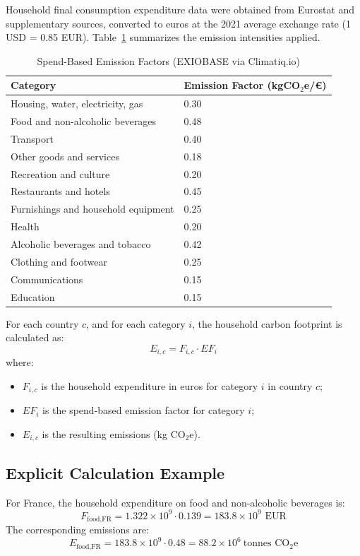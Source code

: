 \documentclass[12pt,a4paper]{article}%
\begin{document}
Household final consumption expenditure data were obtained from Eurostat and supplementary sources, converted to euros at the 2021 average exchange rate (1 USD = 0.85 EUR). Table~\ref{tab:efactors} summarizes the emission intensities applied.

\begin{table}[h]
\centering
\caption{Spend-Based Emission Factors (EXIOBASE via Climatiq.io)}\label{tab:efactors}
\begin{tabular}{@{}ll@{}}
\toprule
\textbf{Category} & \textbf{Emission Factor (kgCO$_{2}$e/€)}\\
\midrule
Housing, water, electricity, gas & 0.30\\
Food and non-alcoholic beverages & 0.48\\
Transport & 0.40\\
Other goods and services & 0.18\\
Recreation and culture & 0.20\\
Restaurants and hotels & 0.45\\
Furnishings and household equipment & 0.25\\
Health & 0.20\\
Alcoholic beverages and tobacco & 0.42\\
Clothing and footwear & 0.25\\
Communications & 0.15\\
Education & 0.15\\
\bottomrule
\end{tabular}
\end{table}

For each country $c$, and for each category $i$, the household carbon footprint is calculated as:
\[
E_{i,c} = F_{i,c} \cdot EF_i
\]
where:
\begin{itemize}
    \item $F_{i,c}$ is the household expenditure in euros for category $i$ in country $c$;
    \item $EF_i$ is the spend-based emission factor for category $i$;
    \item $E_{i,c}$ is the resulting emissions (kg CO$_{2}$e).
\end{itemize}

\subsection{Explicit Calculation Example}

For France, the household expenditure on food and non-alcoholic beverages is:
\[
F_{\text{food,FR}} = 1.322 \times 10^9 \cdot 0.139 = 183.8 \times 10^9 \text{ EUR}
\]
The corresponding emissions are:
\[
E_{\text{food,FR}} = 183.8 \times 10^9 \cdot 0.48 = 88.2 \times 10^6 \ \text{tonnes CO}_{2}\text{e}
\]
\end{document}
